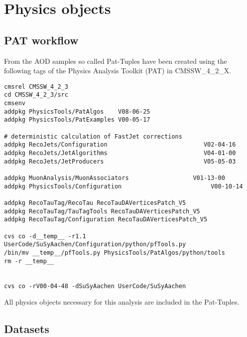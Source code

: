 \section{Physics objects}\label{sec:physobj}

\subsection{PAT workflow}

From the AOD samples so called Pat-Tuples have been created using the following 
tags of the Physics Analysis Toolkit (PAT) in CMSSW\_4\_2\_X. 
\begin{verbatim}
cmsrel CMSSW_4_2_3
cd CMSSW_4_2_3/src
cmsenv
addpkg PhysicsTools/PatAlgos    V08-06-25
addpkg PhysicsTools/PatExamples V00-05-17

# deterministic calculation of FastJet corrections
addpkg RecoJets/Configuration                           V02-04-16
addpkg RecoJets/JetAlgorithms                           V04-01-00      
addpkg RecoJets/JetProducers                            V05-05-03

addpkg MuonAnalysis/MuonAssociators                  V01-13-00
addpkg PhysicsTools/Configuration                         V00-10-14

addpkg RecoTauTag/RecoTau RecoTauDAVerticesPatch_V5  
addpkg RecoTauTag/TauTagTools RecoTauDAVerticesPatch_V5
addpkg RecoTauTag/Configuration RecoTauDAVerticesPatch_V5

cvs co -d__temp__ -r1.1 UserCode/SuSyAachen/Configuration/python/pfTools.py
/bin/mv __temp__/pfTools.py PhysicsTools/PatAlgos/python/tools
rm -r __temp__


cvs co -rV00-04-48 -dSuSyAachen UserCode/SuSyAachen
\end{verbatim}

All physics objects necessary for this analysis are included in the Pat-Tuples.

\subsection{Datasets}

